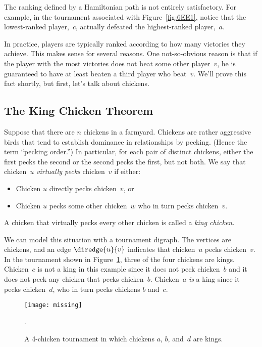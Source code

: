The ranking defined by a Hamiltonian path is not entirely
satisfactory.  For example, in the tournament associated with
Figure~\ref{fig:6EE1}, notice that the lowest-ranked player,~$c$,
actually defeated the highest-ranked player,~$a$.

In practice, players are typically ranked according to how many
victories they achieve.  This makes sense for several reasons.  One
not-so-obvious reason is that if the player with the most victories
does not beat some other player~$v$, he is guaranteed to have at least
beaten a third player who beat~$v$.  We'll prove this fact shortly,
but first, let's talk about chickens.

\subsection{The King Chicken Theorem}

Suppose that there are $n$ chickens in a farmyard.  Chickens are
rather aggressive birds that tend to establish dominance in
relationships by pecking.  (Hence the term ``pecking order.'')  In
particular, for each pair of distinct chickens, either the first pecks
the second or the second pecks the first, but not both.  We say that
chicken~$u$ \emph{virtually pecks} chicken~$v$ if either:
\begin{itemize}

\item Chicken $u$ directly pecks chicken~$v$, or

\item Chicken $u$ pecks some other chicken~$w$ who in turn pecks
  chicken~$v$.

\end{itemize}
A chicken that virtually pecks every other chicken is called a
\emph{king chicken}.

We can model this situation with a tournament digraph.  The vertices
are chickens, and an edge $\diredge{u}{v}$ indicates that chicken~$u$ pecks
chicken~$v$.  In the tournament shown in Figure~\ref{fig:6EE3}, three
of the four chickens are kings.  Chicken~$c$ is not a king in this
example since it does not peck chicken~$b$ and it does not peck any
chicken that pecks chicken~$b$.  Chicken~$a$ \emph{is} a king since it
pecks chicken~$d$, who in turn pecks chickens $b$ and~$c$.

\begin{figure}


\texttt{[image: missing]}

\caption{A 4-chicken tournament in which chickens $a$, $b$, and~$d$
  are kings.}

\label{fig:6EE3}.

\end{figure}

